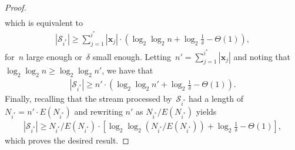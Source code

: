 \documentclass[sigconf]{acmart}
\begin{document}
\begin{proof}
\begin{align*}
    \end{align*}
    which is equivalent to
    \begin{align*}
        |\mathcal{S}_{i^*}| \geq \sum_{j=1}^{i^*} |\mathbf{x}_j| \cdot \left( \log_2\log_2 n + \log_2 \frac{1}{\delta} - \Theta(1) \right),
    \end{align*}
    for~$n$ large enough or~$\delta$ small enough. Letting~$n' =
    \sum_{j=1}^{i^*} |\mathbf{x}_j|$ and noting that~$\log_2\log_2 n \geq
    \log_2\log_2 n'$, we have that 
    \begin{align*}
        |\mathcal{S}_{i^*}| \geq n' \cdot \left( \log_2\log_2 n' + \log_2 \frac{1}{\delta} - \Theta(1) \right).
    \end{align*}
    Finally, recalling that the stream processed by~$\mathcal{S}_{i^*}$ had a
    length of~$N_{i^*}=n' \cdot E(N_{i^*})$ and rewriting $n'$ as
    $N_{i^*}/E(N_{i^*})$ yields
    \begin{align*}
        |\mathcal{S}_{i^*}| \geq N_{i^*}/E(N_{i^*}) \cdot \left[ \log_2\log_2 (N_{i^*}/E(N_{i^*})) + \log_2 \frac{1}{\delta} - \Theta(1) \right],
    \end{align*}
    which proves the desired result.
\end{proof}
\end{document}
